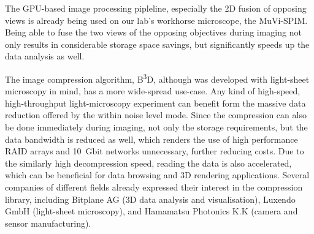 \documentclass{booklet_style}
\def\b3d{B\textsuperscript{3}D}
\begin{document}
  The GPU-based image processing pipleline, especially the 2D fusion of opposing views is already being used on our lab's workhorse microscope, the MuVi-SPIM. Being able to fuse the two views of the opposing objectives during imaging not only results in considerable storage space savings, but significantly speeds up the data analysis as well.

  The image compression algorithm, \b3d, although was developed with light-sheet microscopy in mind, has a more wide-spread use-case. Any kind of high-speed, high-throughput light-microscopy experiment can benefit form the massive data reduction offered by the within noise level mode. Since the compression can also be done immediately during imaging, not only the storage requirements, but the data bandwidth is reduced as well, which renders the use of high performance RAID arrays and \SI{10}{Gbit} networks unnecessary, further reducing costs.
  Due to the similarly high decompression speed, reading the data is also accelerated, which can be beneficial for data browsing and 3D rendering applications. Several companies of different fields already expressed their interest in the compression library, including Bitplane AG (3D data analysis and visualisation), Luxendo GmbH (light-sheet microscopy), and Hamamatsu Photonics K.K (camera and sensor manufacturing).







\end{document}
